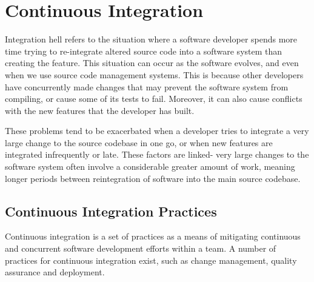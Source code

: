 \documentclass[a4paper, openany]{memoir}
\begin{document}
\chapter{Continuous Integration}

Integration hell refers to the situation where a software developer spends more time trying to re-integrate altered source code into a software system than creating the feature. This situation can occur as the software evolves, and even when we use source code management systems. This is because other developers have concurrently made changes that may prevent the software system from compiling, or cause some of its tests to fail. Moreover, it can also cause conflicts with the new features that the developer has built.

These problems tend to be exacerbated when a developer tries to integrate a very large change to the source codebase in one go, or when new features are integrated infrequently or late. These factors are linked- very large changes to the software system often involve a considerable greater amount of work, meaning longer periods between reintegration of software into the main source codebase.

\section{Continuous Integration Practices}
Continuous integration is a set of practices as a means of mitigating continuous and concurrent software development efforts within a team. A number of practices for continuous integration exist, such as change management, quality assurance and deployment.
\end{document}
